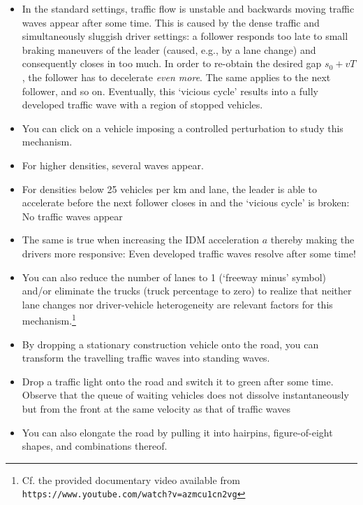 \documentclass[paper=A4,pagesize=auto,11pt]{scrartcl}
\providecommand{\gquote}[1]{`#1'}
\begin{document}
\begin{itemize}
\item In the standard settings, traffic flow is unstable and backwards
  moving traffic waves appear after some time. This is caused by the
  dense traffic and simultaneously sluggish driver settings: a follower
  responds too late to small braking maneuvers of the leader (caused,
  e.g., by a lane change) and consequently closes in too much. In
  order to re-obtain the desired gap $s_0+vT$, the follower has to
  decelerate \emph{even more}. The same applies
  to the next follower, and so on. Eventually, this \gquote{vicious
    cycle} results into a fully developed traffic wave with a region
  of  stopped vehicles.
\item You can click on a vehicle imposing a controlled 
perturbation to
  study this mechanism.
\item For higher densities, several waves appear.
\item For densities below 25 vehicles per km and lane, the leader is
  able to accelerate before the next follower closes in and the
  \gquote{vicious cycle} is broken: No traffic waves appear
\item The same is true when increasing the IDM acceleration $a$
  thereby making the drivers more responsive: Even developed traffic
  waves resolve after some time!
\item You can also reduce the number of lanes to 1 (\gquote{freeway
  minus} symbol) and/or eliminate the trucks (truck percentage to
  zero) to realize that neither lane changes nor driver-vehicle
  heterogeneity are relevant factors for this
  mechanism.\footnote{Cf. the provided documentary video available
    from \texttt{https://www.youtube.com/watch?v=azmcu1cn2vg}} 
\item By dropping a stationary construction vehicle onto the road, you
  can transform the travelling traffic waves into standing waves.
\item Drop a traffic light onto the road and switch it to
  green after some time. Observe that the queue of waiting vehicles
  does not dissolve instantaneously but from the front at the same
  velocity as that of traffic waves
\item You can also elongate the road by pulling it into hairpins,
  figure-of-eight shapes, and combinations thereof.
\end{itemize}
\end{document}
